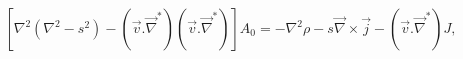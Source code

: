 \begin{equation}
\left[  \nabla^{2}(\nabla^{2}-s^{2})-(\overrightarrow{v}.\overrightarrow
{\nabla}^{\ast})(\overrightarrow{v}.\overrightarrow{\nabla}^{\ast})\right]
A_{0}=-\nabla^{2}\rho-s\overrightarrow{\nabla}\times\overrightarrow
{j}-(\overrightarrow{v}.\overrightarrow{\nabla}^{\ast})J, \label{Azero6a}%
\end{equation}

